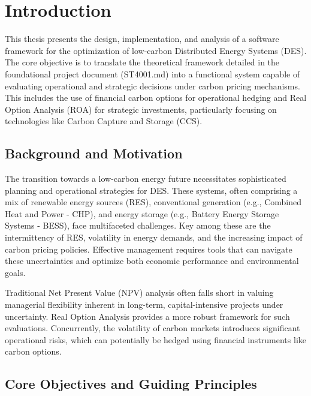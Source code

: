 \chapter{Introduction}
\label{chap:introduction}

This thesis presents the design, implementation, and analysis of a software framework for the optimization of low-carbon Distributed Energy Systems (DES). The core objective is to translate the theoretical framework detailed in the foundational project document (ST4001.md) into a functional system capable of evaluating operational and strategic decisions under carbon pricing mechanisms. This includes the use of financial carbon options for operational hedging and Real Option Analysis (ROA) for strategic investments, particularly focusing on technologies like Carbon Capture and Storage (CCS).

\section{Background and Motivation}

The transition towards a low-carbon energy future necessitates sophisticated planning and operational strategies for DES. These systems, often comprising a mix of renewable energy sources (RES), conventional generation (e.g., Combined Heat and Power - CHP), and energy storage (e.g., Battery Energy Storage Systems - BESS), face multifaceted challenges. Key among these are the intermittency of RES, volatility in energy demands, and the increasing impact of carbon pricing policies. Effective management requires tools that can navigate these uncertainties and optimize both economic performance and environmental goals.

Traditional Net Present Value (NPV) analysis often falls short in valuing managerial flexibility inherent in long-term, capital-intensive projects under uncertainty. Real Option Analysis provides a more robust framework for such evaluations. Concurrently, the volatility of carbon markets introduces significant operational risks, which can potentially be hedged using financial instruments like carbon options.

\section{Core Objectives and Guiding Principles}

